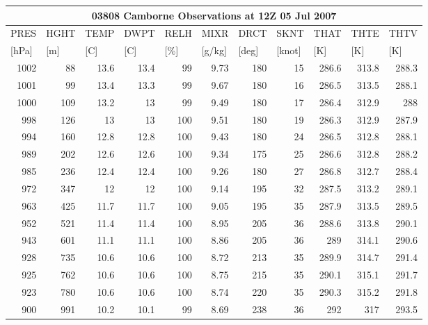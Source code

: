 \documentclass{article}
\begin{document}
\begin{longtable}{r|r|r|r|r|r|r|r|r|r|r}
\multicolumn{11}{c}{\textbf{03808 Camborne Observations at 12Z 05 Jul 2007}}\\ \hline
\multicolumn{1}{l}{PRES } & \multicolumn{1}{l}{HGHT } & \multicolumn{1}{l}{TEMP } & \multicolumn{1}{l}{DWPT } & \multicolumn{1}{l}{RELH } & \multicolumn{1}{l}{MIXR } & \multicolumn{1}{l}{DRCT } & \multicolumn{1}{l}{SKNT } & \multicolumn{1}{l}{THAT } & \multicolumn{1}{l}{ THTE } & \multicolumn{1}{l}{THTV } \\
\multicolumn{1}{l}{[hPa]} & \multicolumn{1}{l}{[m]} & \multicolumn{1}{l}{[C]} & \multicolumn{1}{l}{[C] } & \multicolumn{1}{l}{[\%]} & \multicolumn{1}{l}{[g/kg]} & \multicolumn{1}{l}{[deg]} & \multicolumn{1}{l}{[knot]} & \multicolumn{1}{l}{[K]} & \multicolumn{1}{l}{[K]} & \multicolumn{1}{l}{[K]} \\ \hline
1002 & 88 & 13.6 & 13.4 & 99 & 9.73 & 180 & 15 & 286.6 & 313.8 & 288.3 \\
1001 & 99 & 13.4 & 13.3 & 99 & 9.67 & 180 & 16 & 286.5 & 313.5 & 288.1 \\
1000 & 109 & 13.2 & 13 & 99 & 9.49 & 180 & 17 & 286.4 & 312.9 & 288 \\
998 & 126 & 13 & 13 & 100 & 9.51 & 180 & 19 & 286.3 & 312.9 & 287.9 \\
994 & 160 & 12.8 & 12.8 & 100 & 9.43 & 180 & 24 & 286.5 & 312.8 & 288.1 \\
989 & 202 & 12.6 & 12.6 & 100 & 9.34 & 175 & 25 & 286.6 & 312.8 & 288.2 \\
985 & 236 & 12.4 & 12.4 & 100 & 9.26 & 180 & 27 & 286.8 & 312.7 & 288.4 \\
972 & 347 & 12 & 12 & 100 & 9.14 & 195 & 32 & 287.5 & 313.2 & 289.1 \\
963 & 425 & 11.7 & 11.7 & 100 & 9.05 & 195 & 35 & 287.9 & 313.5 & 289.5 \\
952 & 521 & 11.4 & 11.4 & 100 & 8.95 & 205 & 36 & 288.6 & 313.8 & 290.1 \\
943 & 601 & 11.1 & 11.1 & 100 & 8.86 & 205 & 36 & 289 & 314.1 & 290.6 \\
928 & 735 & 10.6 & 10.6 & 100 & 8.72 & 213 & 35 & 289.9 & 314.7 & 291.4 \\
925 & 762 & 10.6 & 10.6 & 100 & 8.75 & 215 & 35 & 290.1 & 315.1 & 291.7 \\
923 & 780 & 10.6 & 10.6 & 100 & 8.74 & 220 & 35 & 290.3 & 315.2 & 291.8 \\
900 & 991 & 10.2 & 10.1 & 99 & 8.69 & 238 & 36 & 292 & 317 & 293.5 \\

\end{longtable}
\end{document}
